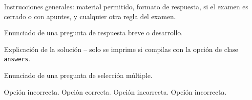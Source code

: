 \vspace{6pt}
\begin{center}
\end{center}
\vspace{6pt}

\begin{icvnote}[Instrucciones]
Instrucciones generales: material permitido, formato de respuesta, si el
examen es cerrado o con apuntes, y cualquier otra regla del examen.
\end{icvnote}

\begin{questions}

\question[10] Enunciado de una pregunta de respuesta breve o desarrollo.
\begin{solution}
Explicación de la solución -- solo se imprime si compilas con la opción
de clase \texttt{answers}.
\end{solution}

\question[15] Enunciado de una pregunta de selección múltiple.
\begin{choices}
  \choice Opción incorrecta.
  \CorrectChoice Opción correcta.
  \choice Opción incorrecta.
  \choice Opción incorrecta.
\end{choices}

\end{questions}


